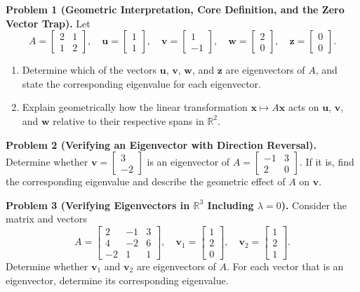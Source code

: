 \documentclass[11pt, letterpaper]{article}
\theoremstyle{definition}
\theoremstyle{remark}
\begin{document}
\textbf{Problem 1 (Geometric Interpretation, Core Definition, and the Zero Vector Trap).}
Let
\[
A = \begin{bmatrix} 2 & 1 \\ 1 & 2 \end{bmatrix}, \quad \mathbf{u} = \begin{bmatrix} 1 \\ 1 \end{bmatrix}, \quad \mathbf{v} = \begin{bmatrix} 1 \\ -1 \end{bmatrix}, \quad \mathbf{w} = \begin{bmatrix} 2 \\ 0 \end{bmatrix}, \quad \mathbf{z} = \begin{bmatrix} 0 \\ 0 \end{bmatrix}.
\]
\begin{enumerate}[label=(\alph*)]
    \item Determine which of the vectors $\mathbf{u}$, $\mathbf{v}$, $\mathbf{w}$, and $\mathbf{z}$ are eigenvectors of $A$, and state the corresponding eigenvalue for each eigenvector.
    \item Explain geometrically how the linear transformation $\mathbf{x} \mapsto A\mathbf{x}$ acts on $\mathbf{u}$, $\mathbf{v}$, and $\mathbf{w}$ relative to their respective spans in $\mathbb{R}^2$.
\end{enumerate}

\textbf{Problem 2 (Verifying an Eigenvector with Direction Reversal).}
Determine whether $\mathbf{v} = \begin{bmatrix} 3 \\ -2 \end{bmatrix}$ is an eigenvector of $A = \begin{bmatrix} -1 & 3 \\ 2 & 0 \end{bmatrix}$. If it is, find the corresponding eigenvalue and describe the geometric effect of $A$ on $\mathbf{v}$.

\textbf{Problem 3 (Verifying Eigenvectors in $\mathbb{R}^3$ Including $\lambda = 0$).}
Consider the matrix and vectors
\[
A = \begin{bmatrix} 2 & -1 & 3 \\ 4 & -2 & 6 \\ -2 & 1 & 1 \end{bmatrix}, \quad \mathbf{v}_1 = \begin{bmatrix} 1 \\ 2 \\ 0 \end{bmatrix}, \quad \mathbf{v}_2 = \begin{bmatrix} 1 \\ 2 \\ 1 \end{bmatrix}.
\]
Determine whether $\mathbf{v}_1$ and $\mathbf{v}_2$ are eigenvectors of $A$. For each vector that is an eigenvector, determine its corresponding eigenvalue.
\end{document}
